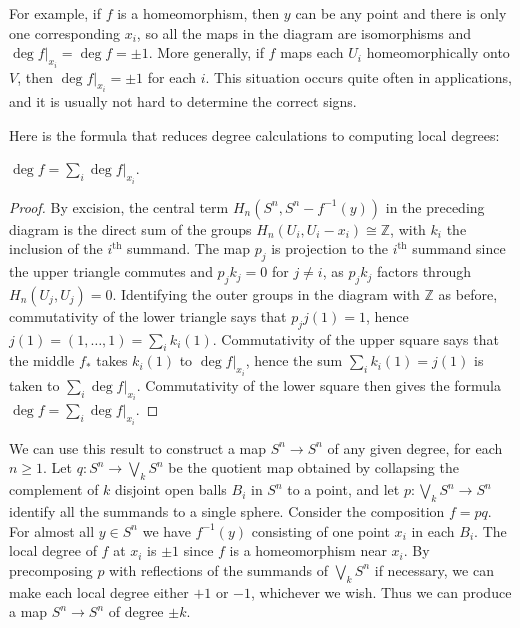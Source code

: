 For example, if $f$ is a homeomorphism, then $y$ can be any point and there is
only one corresponding $x_i$, so all the maps in the diagram are isomorphisms and
$\deg f|_{x_i} = \deg f = \pm 1$. More generally, if $f$ maps each $U_i$ homeomorphically onto
$V$, then $\deg f|_{x_i} = \pm 1$ for each $i$. This situation occurs quite often in applications,
and it is usually not hard to determine the correct signs.

Here is the formula that reduces degree calculations to computing local degrees:

\begin{proposition}
\label{prop:local-degree-formula}
$\deg f = \sum_i \deg f|_{x_i}$.
\end{proposition}
\begin{proof}
 By excision, the central term $H_n(S^n, S^n - f^{-1}(y))$ in the preceding diagram
is the direct sum of the groups $H_n(U_i, U_i - x_i) \cong \mathbb{Z}$, with $k_i$ the inclusion of the $i^{\text{th}}$
summand. The map $p_j$ is projection to the $i^{\text{th}}$ summand since the upper triangle
commutes and $p_j k_j = 0$ for $j \ne i$, as $p_j k_j$ factors through $H_n(U_j, U_j) = 0$. Identifying the outer groups in the diagram with $\mathbb{Z}$ as before, commutativity of the lower
triangle says that $p_j j(1) = 1$, hence $j(1) = (1, \ldots, 1) = \sum_i k_i(1)$. Commutativity of
the upper square says that the middle $f_*$ takes $k_i(1)$ to $\deg f|_{x_i}$, hence the sum
$\sum_i k_i(1) = j(1)$ is taken to $\sum_i \deg f|_{x_i}$. Commutativity of the lower square then
gives the formula $\deg f = \sum_i \deg f|_{x_i}$.
\end{proof}
\begin{example}
\label{ex:degree-reflection-antipodal}
We can use this result to construct a map $S^n \to S^n$ of any given degree,
for each $n \ge 1$. Let $q: S^n \to \bigvee_k S^n$ be the quotient map obtained by collapsing the
complement of $k$ disjoint open balls $B_i$ in $S^n$ to a point, and let $p: \bigvee_k S^n \to S^n$ identify
all the summands to a single sphere. Consider the composition $f = pq$. For almost all
$y \in S^n$ we have $f^{-1}(y)$ consisting of one point $x_i$ in each $B_i$. The local degree of $f$
at $x_i$ is $\pm 1$ since $f$ is a homeomorphism near $x_i$. By precomposing $p$ with reflections
of the summands of $\bigvee_k S^n$ if necessary, we can make each local degree either $+1$ or
$-1$, whichever we wish. Thus we can produce a map $S^n \to S^n$ of degree $\pm k$.
\end{example}

